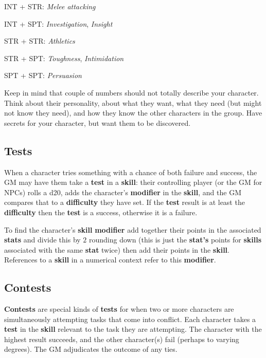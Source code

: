 \documentclass[11pt]{article}
\begin{document}
\begin{multicols}{3}
\begin{multicols}{2}
    INT + STR: ​\textit{Melee attacking}

    INT + SPT: \textit{Investigation}, \textit{Insight}

    STR + STR: \textit{​Athletics}

    STR + SPT: \textit{​Toughness}, \textit{Intimidation}

    SPT + SPT: ​\textit{Persuasion}
  \end{multicols}

  Keep in mind that couple of numbers should not totally describe your character. Think about their personality, about what they want, what they need (but might not know they need), and how they know the other characters in the group. Have secrets for your character, but want them to be discovered.

  \subsection*{Tests}

  When a character tries something with a chance of both failure and success, the GM may have them take a \textbf{​test}​ in a \textbf{skill}: their controlling player (or the GM for NPCs) rolls a d20, adds the character's \textbf{modifier} in the \textbf{skill}, and the GM compares that to a \textbf{difficulty} they have set. If the \textbf{test} result is at least the \textbf{difficulty} then the \textbf{test} is a success, otherwise it is a failure.

  To find the character's \textbf{skill} \textbf{modifier} add together their points in the associated \textbf{stats} and divide this by $2$ rounding down (this is just the \textbf{stat's} points for \textbf{skills} associated with the same \textbf{stat} twice) then add their points in the \textbf{skill}. References to a \textbf{skill} in a numerical context refer to this \textbf{modifier}.

  \subsection*{Contests}

  \textbf{Contests} are special kinds of \textbf{tests} for when two or more characters are simultaneously attempting tasks that come into conflict. Each character takes a \textbf{test} in the \textbf{skill} relevant to the task they are attempting. The character with the highest result succeeds, and the other character(s) fail (perhaps to varying degrees). The GM adjudicates the outcome of any ties.


\end{multicols}
\end{document}
